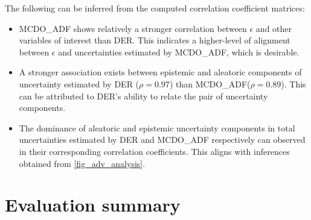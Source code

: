 The following can be inferred from the computed correlation coefficient matrices:
\begin{itemize}
	\item MCDO\_ADF shows relatively a stronger correlation between $\epsilon$ and other variables of interest than DER. This indicates a higher-level of alignment between $\epsilon$ and uncertainties estimated by MCDO\_ADF, which is desirable.
	\item A stronger association exists between epistemic and aleatoric components of uncertainty estimated by DER ($\rho = 0.97$) than MCDO\_ADF($\rho = 0.89$). This can be attributed to DER's ability to relate the pair of uncertainty components.
	\item The dominance of aleatoric and epistemic uncertainty components in total uncertainties estimated by DER and MCDO\_ADF respectively can observed in their corresponding correlation coefficients. This aligns with inferences obtained from \ref{fig_adv_analysis}. 
\end{itemize}

\section{Evaluation summary}

